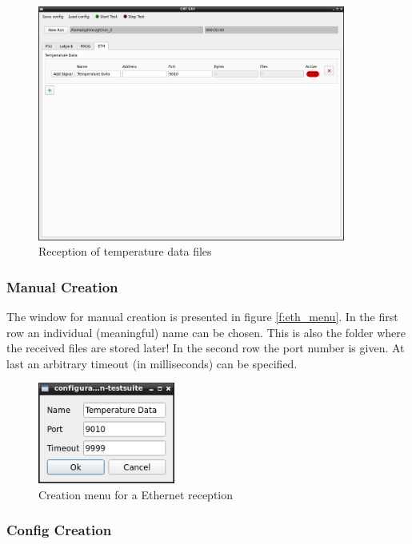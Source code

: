 \documentclass[10pt,a4paper]{article}
\begin{document}
	\begin{figure}[H]
\centering
\includegraphics[width=0.9\textwidth]{./8_ETH_example.png}
\caption{Reception of temperature data files}
\label{f:eth_example}
	\end{figure}	 
	
	\subsubsection{Manual Creation}	
	\label{c:eth_manual_creation}
	
	The window for manual creation is presented in figure \eqref{f:eth_menu}. In the first row an individual (meaningful) name can be chosen. This is also the folder where the received files are stored later! In the second row the port number is given. At last an arbitrary timeout (in milliseconds) can be specified.
	
	\begin{figure}[H]
	\centering
	\includegraphics[width=0.4\textwidth]{./8_ETH_menu.png}
	\caption{Creation menu for a Ethernet reception}
	\label{f:eth_menu}
	\end{figure}
	
	\subsubsection{Config Creation}
	
\end{document}
